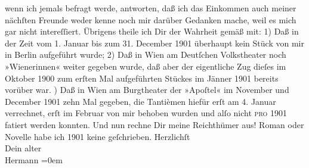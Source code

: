\begin{ledgroupsized}[t]{13cm}
               wenn ich jemals befragt werde, antworten, daß ich das Einkommen {\pb}auch meiner nächſten Freunde weder kenne noch mir
               darüber Gedanken mache, weil es mich gar nicht intereſſiert.\pend
           \pstart
           Übrigens theile ich Dir der Wahrheit gemäß mit: 1) Daß in der Zeit vom 1. Januar bis
               zum 31. December 1901 überhaupt kein Stück von mir in Berlin aufgeführt wurde; {\pb}2) Daß in Wien am Deutſchen
                  Volkstheater noch »Wienerinnen« weiter
               gegeben wurde, daß aber der eigentliche Zug dieſes im Oktober 1900 zum erſten Mal
               aufgeführten Stückes im Jänner 1901 bereits vorüber war.\pend
           ) Daß in Wien am Burgtheater der »Apoſtel« im November
               und December 1901 zehn Mal gegeben, die {\pb}Tantièmen
               hiefür erſt am 4. Januar verrechnet, erſt im Februar von mir behoben wurden und alſo
               nicht \textsc{pro} 1901 fatiert werden konnten. Und nun rechne Dir
               meine Reichthümer aus! Roman oder Novelle habe ich 1901 keine geſchrieben.\pend
           \pstart
           Herzlichſt{\\[\baselineskip]}Dein alter{\\[\baselineskip]}\spacefill\mbox{Hermann}\pend
           \leftskip=0em{}
         
         \endnumbering{}\end{ledgroupsized}  \newcommand{\dateiname}{L01230}\newcommand{\titel}{Hermann Bahr an Arthur Schnitzler, 10. 7. [1902]}\newcommand{\editorInnen}{ Kurt Ifkovits,  Martin Anton Müller}
      